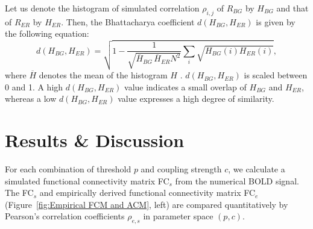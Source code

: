 \documentclass[fleqn,10pt]{wlpeerj}
\newcommand{\reg}[1]{~ \\ \textcolor{red}{\framebox{\begin{minipage}{0.9\linewidth}\footnotesize\em
#1  \end{minipage}}}\\}
\begin{document}
Let us denote the histogram of simulated correlation $\rho_{i,j}$ of $R_{BG}$ by $H_{BG}$ and that of
$R_{ER}$ by $H_{ER}$. Then, the Bhattacharya coefficient $d\left(H_{BG}, H_{ER}\right)$ is given by the following
equation:
\begin{equation}
d\left(H_{BG}, H_{ER}\right) = \sqrt{1- \dfrac{1}{ \sqrt{\overline{H}_{BG}\, \overline{H}_{ER} N^2}} \sum_{i}
\sqrt{H_{BG}(i)H_{ER}(i)} } ,
\end{equation}
where $\overline{H}$ denotes the mean of the histogram $H$ \citep{XYZ43}. $d\left(H_{BG}, H_{ER}\right)$ is scaled
between 0 and 1. A high $d\left(H_{BG}, H_{ER}\right)$ value indicates a small overlap of $H_{BG}$ and $H_{ER}$,
whereas a low $d\left(H_{BG}, H_{ER}\right)$ value expresses a high degree of similarity. 


\section*{Results \& Discussion}

For each combination of threshold $p$ and coupling strength $c$, we calculate a simulated functional
connectivity matrix FC$_s$ from the numerical BOLD signal. The FC$_s$ and empirically derived functional connectivity
matrix FC$_e$ (Figure~\ref{fig:Empirical FCM and ACM}, left) are
compared quantitatively by Pearson's correlation coefficients $\rho_{e,s}$ in parameter space $(p,c)$.

\end{document}
